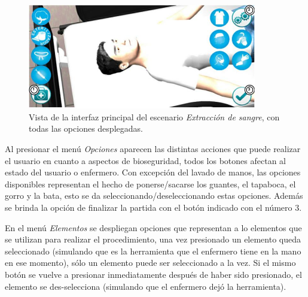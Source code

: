 \begin{figure}[H]
\centering
\includegraphics[width=10cm]{solucion/images/hemocultivo_menus.jpg}
\caption{Vista de la interfaz principal del escenario \emph{Extracción de
        sangre}, con todas las opciones desplegadas.}
\label{fig:hemocultivo_gui}
\end{figure}




Al presionar el menú \emph{Opciones} aparecen las distintas
acciones que puede realizar el usuario en cuanto a aspectos de bioseguridad, 
todos los botones afectan al estado del usuario o enfermero. Con excepción 
del lavado de manos, las opciones disponibles representan el hecho de 
ponerse/sacarse los guantes, el tapaboca, el gorro y la bata, esto se da 
seleccionando/deseleccionando estas opciones. Además se brinda la opción de 
finalizar la partida con el botón indicado con el número $3$.


En el menú \emph{Elementos} se despliegan opciones que representan a lo elementos que se
utilizan para realizar el procedimiento, una vez presionado un elemento queda
seleccionado (simulando que es la herramienta que el enfermero tiene en la mano
en ese momento), sólo un elemento puede ser seleccionado a la vez. Si el mismo
botón se vuelve a presionar inmediatamente después de haber sido presionado, el
elemento se des-selecciona (simulando que el enfermero dejó la herramienta).


